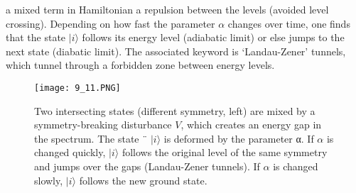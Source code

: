 a mixed term in Hamiltonian a repulsion between the levels (avoided level crossing). Depending on how fast the parameter $\alpha$ changes over time, one finds that the state $| i\rangle$ follows its energy level (adiabatic limit) or else jumps to the next state (diabatic limit). The associated keyword is  `Landau-Zener' tunnels, which tunnel through a forbidden zone between energy levels.
\begin{figure}[ht]
        \centering
        \texttt{[image: 9\_11.PNG]}
        \caption{Two intersecting states (different symmetry, left) are mixed by a symmetry-breaking disturbance $V$, which creates an energy gap in the spectrum. The state ¨ $| i\rangle$ is deformed by the parameter α. If $\alpha$ is changed quickly, $| i\rangle$ follows the original level of the same symmetry and jumps over the gaps (Landau-Zener tunnels). If $\alpha$ is changed slowly, $| i\rangle$ follows the new ground state.}
\end{figure}